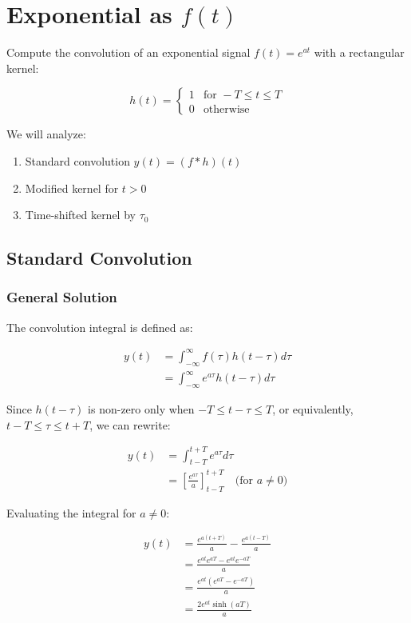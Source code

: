 \section{Exponential as $f(t)$}
Compute the convolution of an exponential signal $f(t) = e^{at}$ with a rectangular kernel:

\begin{equation}
h(t) = 
\begin{cases} 
1 & \text{for } -T \leq t \leq T \\
0 & \text{otherwise}
\end{cases}
\end{equation}

We will analyze:
\begin{enumerate}
    \item Standard convolution $y(t) = (f*h)(t)$
    \item Modified kernel for $t > 0$
    \item Time-shifted kernel by $\tau_0$
\end{enumerate}

\subsection{Standard Convolution}
\subsubsection{General Solution}
The convolution integral is defined as:

\begin{align}
y(t) &= \int_{-\infty}^{\infty} f(\tau)h(t-\tau)d\tau \\
&= \int_{-\infty}^{\infty} e^{a\tau}h(t-\tau)d\tau
\end{align}

Since $h(t-\tau)$ is non-zero only when $-T \leq t-\tau \leq T$, or equivalently, $t-T \leq \tau \leq t+T$, we can rewrite:

\begin{align}
y(t) &= \int_{t-T}^{t+T} e^{a\tau}d\tau \\
&= \left[ \frac{e^{a\tau}}{a} \right]_{t-T}^{t+T} \quad \text{(for $a \neq 0$)}
\end{align}

Evaluating the integral for $a \neq 0$:

\begin{align}
y(t) &= \frac{e^{a(t+T)}}{a} - \frac{e^{a(t-T)}}{a} \\
&= \frac{e^{at}e^{aT} - e^{at}e^{-aT}}{a} \\
&= \frac{e^{at}(e^{aT} - e^{-aT})}{a} \\
&= \frac{2e^{at}\sinh(aT)}{a}
\end{align}

